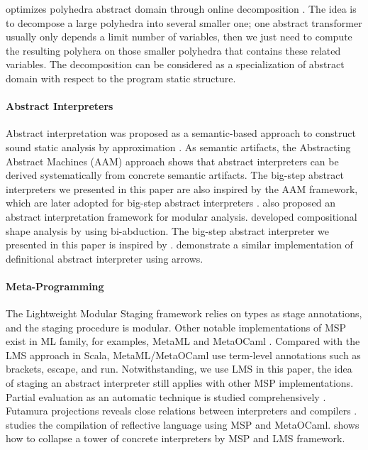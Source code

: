 \citeauthor{DBLP:conf/popl/SinghPV17} optimizes polyhedra abstract domain
through online decomposition \cite{DBLP:conf/popl/SinghPV17,
Singh:2017:PCD:3177123.3158143}. The idea is to decompose a large polyhedra into
several smaller one; one abstract transformer usually only depends a limit
number of variables, then we just need to compute the resulting polyhera on
those smaller polyhedra that contains these related variables. The decomposition
can be considered as a specialization of abstract domain with respect to the
program static structure.

\paragraph{Abstract Interpreters} Abstract interpretation was proposed as a
semantic-based approach to construct sound static analysis by approximation
\cite{DBLP:conf/popl/CousotC77}. As semantic artifacts, the Abstracting Abstract
Machines (AAM) \cite{DBLP:journals/jfp/HornM12, DBLP:conf/icfp/HornM10} approach
shows that abstract interpreters can be derived systematically from concrete
semantic artifacts. The big-step abstract interpreters we presented in this
paper are also inspired by the AAM framework, which are later adopted for
big-step abstract interpreters \cite{DBLP:journals/pacmpl/DaraisLNH17,
Wei:2018:RAA:3243631.3236800}. \citet{DBLP:conf/cc/CousotC02} also proposed an
abstract interpretation framework for modular analysis.
\citet{DBLP:conf/popl/CalcagnoDOY09} developed compositional shape analysis by
using bi-abduction. The big-step abstract interpreter we presented in this paper
is inspired by \cite{DBLP:journals/pacmpl/DaraisLNH17,
Wei:2018:RAA:3243631.3236800}. \citet{Keidel:2018:CSP:3243631.3236767}
demonstrate a similar implementation of definitional abstract interpreter using
arrows.

\paragraph{Meta-Programming} The Lightweight Modular Staging framework relies on
types as stage annotations, and the staging procedure is modular. Other notable
implementations of MSP exist in ML family, for examples, MetaML
\cite{DBLP:conf/pepm/TahaS97} and MetaOCaml \cite{DBLP:conf/gpce/CalcagnoTHL03,
DBLP:conf/flops/Kiselyov14}. Compared with the LMS approach in Scala,
MetaML/MetaOCaml use term-level annotations such as brackets, escape, and run.
Notwithstanding, we use LMS in this paper, the idea of staging an abstract
interpreter still applies with other MSP implementations. Partial evaluation as
an automatic technique is studied comprehensively
\cite{10.1007/3-540-61580-6_11, DBLP:books/daglib/0072559}. Futamura projections
reveals close relations between interpreters and compilers \cite{Futamura1999,
futamura1971partial}. \citet{DBLP:conf/gpce/Asai14} studies the compilation of
reflective language using MSP and MetaOCaml.
\citeauthor{Amin:2017:CTI:3177123.3158140} shows how to collapse a tower of
concrete interpreters by MSP and LMS framework.
